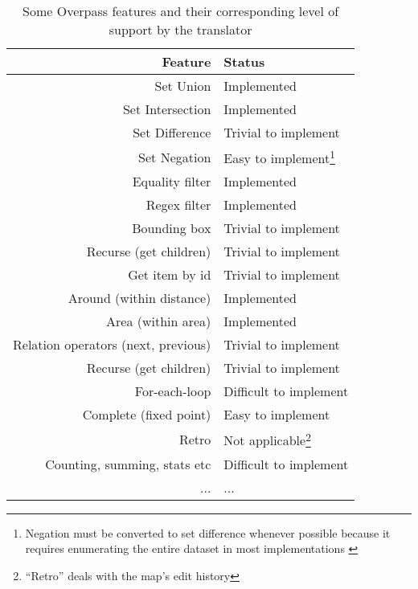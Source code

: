 \documentclass[main.tex]{subfiles}
\begin{document}
\begin{samepage}
\begin{table}[h]
    \begin{center}
        \begin{tabular}{|r|l|}
            \hline
            Feature & Status \\
            \hline
            Set Union & Implemented \\
            Set Intersection & Implemented \\
            Set Difference & Trivial to implement \\
            Set Negation & Easy to implement\footnote{
                Negation must be converted to set difference whenever possible
                because it requires enumerating the entire dataset in most
                implementations \cite{overpass}
            }    \\
            Equality filter & Implemented \\
            Regex filter & Implemented \\
            Bounding box & Trivial to implement \\
            Recurse (get children) & Trivial to implement \\
            Get item by id & Trivial to implement \\
            Around (within distance) & Implemented \\
            Area (within area) & Implemented \\
            Relation operators (next, previous) & Trivial to implement \\
            Recurse (get children) & Trivial to implement \\
            For-each-loop & Difficult to implement \\
            Complete (fixed point) & Easy to implement \\
            Retro & Not applicable\footnote{``Retro'' deals with the map's edit
                history} \\
            Counting, summing, stats etc & Difficult to implement \\
            ... & ... \\
            \hline
        \end{tabular}
    \end{center}
    \caption{Some Overpass features and their corresponding level of support by the translator}
    \label{table:overpassfeatures}
\end{table}
\end{samepage}
\end{document}
